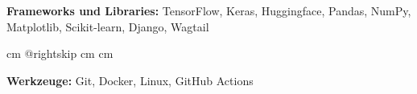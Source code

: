 \documentclass[10pt, a4paper]{article}
\begin{document}
        \textbf{Frameworks und Libraries:} TensorFlow, Keras, Huggingface, Pandas, NumPy, Matplotlib, Scikit-learn, Django, Wagtail
        \par\endgroup

        \vspace{0.2 cm}
        \begingroup{} cm
        \advance\csname @rightskip cm
        \advance{} cm

        \textbf{Werkzeuge:} Git, Docker, Linux, GitHub Actions
        \par\endgroup


    
\end{document}
